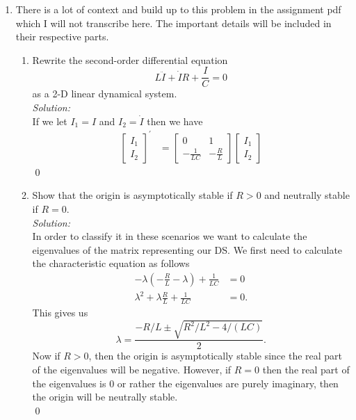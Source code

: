 \documentclass[10pt]{amsart}
\theoremstyle{nonumberplain}
\begin{document}
\begin{enumerate}[label={\bf {\arabic*}:}]
\newpage

\item There is a lot of context and build up to this problem in the assignment pdf which I will not transcribe here.
The important details will be included in their respective parts. \\

\begin{enumerate}

\item Rewrite the second-order differential equation
$$L \ddot I + \dot I R + \frac I C = 0$$
as a 2-D linear dynamical system. \\
\textit{Solution:} \\
If we let $I_1 = I$ and $I_2 = \dot I$ then we have
\begin{align*}
\begin{bmatrix}
I_1 \\ I_2
\end{bmatrix}^\prime
&= \begin{bmatrix}
0 & 1 \\
-\frac 1 {LC} & -\frac R L
\end{bmatrix} \begin{bmatrix}
I_1 \\ I_2
\end{bmatrix}
\end{align*}
\qed \\

\item Show that the origin is asymptotically stable if $R > 0$ and neutrally stable if $R = 0$. \\
\textit{Solution:} \\
In order to classify it in these scenarios we want to calculate the eigenvalues of the matrix representing our DS.
We first need to calculate the characteristic equation as follows
\begin{align*}
-\lambda \left(- \frac R L - \lambda \right) + \frac 1 {LC} &= 0 \\
\lambda^2 + \lambda \frac R L + \frac 1 {LC} &= 0.
\end{align*}
This gives us
\begin{equation}
\lambda = \frac {-R/L \pm \sqrt{R^2/L^2 - 4/(LC)} }{2}.
\label{eq:eq2}
\end{equation}
Now if $R > 0$, then the origin is asymptotically stable since the real part of the eigenvalues will be negative.
However, if $R = 0$ then the real part of the eigenvalues is $0$ or rather the eigenvalues are purely imaginary, then the origin will be neutrally stable. \\
\qed \\


\end{enumerate}
\end{enumerate}
\end{document}
